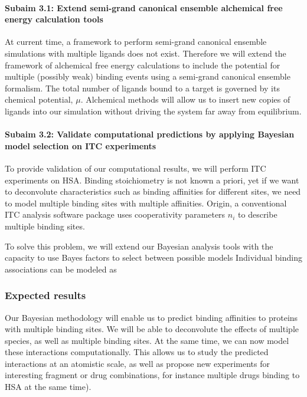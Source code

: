 \documentclass[10pt,final]{article}
\newcommand{\subsubsubsection}[1]{\paragraph*{#1}}
\begin{document}
\begin{center}
\end{center}

\subsubsubsection{Subaim 3.1: Extend semi-grand canonical ensemble alchemical free energy calculation tools}
At current time, a framework to perform semi-grand canonical ensemble simulations with multiple ligands does not exist. Therefore we will extend the framework of alchemical free energy calculations to include the potential for multiple (possibly weak) binding events using a semi-grand canonical ensemble formalism. 
The total number of ligands bound to a target is governed by its chemical potential, $\mu$. Alchemical methods will allow us to insert new copies of ligands into our simulation without driving the system far away from equilibrium. 

\begin{center}
\end{center}

\subsubsubsection{Subaim 3.2: Validate computational predictions by applying Bayesian model selection on ITC  experiments}
To provide validation of our computational results, we will perform ITC experiments on HSA. Binding stoichiometry is not known a priori, yet if we want to deconvolute characteristics such as binding affinities for different sites, we need to model multiple binding sites with multiple affinities.
Origin, a conventional ITC analysis software package uses cooperativity parameters $n_i$ to describe multiple binding sites\cite{MicroCal2004a}.


To solve this problem, we will extend our Bayesian analysis tools with the capacity to use Bayes factors to select between possible models 
Individual binding associations can be modeled as

\subsubsection*{Expected results}
Our Bayesian methodology will enable us to predict binding affinities to proteins with multiple binding sites. We will be able to deconvolute the effects of multiple species, as well as multiple binding sites. At the same time, we can now model these interactions computationally. This allows us to study the predicted interactions at an atomistic scale, as well as propose new experiments for interesting fragment or drug combinations, for instance multiple drugs binding to HSA at the same time).
\end{document}
